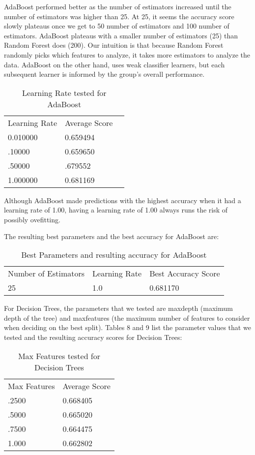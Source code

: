 \documentclass[11pt]{article}
\begin{document}
AdaBoost performed better as the number of estimators increased until the number of estimators was higher than 25. At 25, it seems the accuracy score slowly plateaus once we get to 50 number of estimators and 100 number of estimators. AdaBoost plateaus with a smaller number of estimators (25) than Random Forest does (200). Our intuition is that because Random Forest randomly picks which features to analyze, it takes more estimators to analyze the data. AdaBoost on the other hand, uses weak classifier learners, but each subsequent learner is informed by the group's overall performance. 

\begin{table}[H]
\centering
\caption{Learning Rate tested for AdaBoost}
\label{my-label}
\begin{tabular}{lll}
Learning Rate & Average Score &  \\
0.010000      & 0.659494      &  \\
.10000        & 0.659650      &  \\
.50000        & .679552       &  \\
1.000000      & 0.681169      & 
\end{tabular}
\end{table}


Although AdaBoost made predictions with the highest accuracy when it had a learning rate of 1.00, having a learning rate of 1.00 always runs the risk of possibly ovefitting.

The resulting best parameters and the best accuracy for AdaBoost are:

\begin{table}[H]
\centering
\caption{Best Parameters and resulting accuracy for AdaBoost}
\label{my-label}
\begin{tabular}{lll}
Number of Estimators & Learning Rate & Best Accuracy Score \\
25                   & 1.0           & 0.681170
\end{tabular}
\end{table}

For Decision Trees, the parameters that we tested are max\textunderscore depth (maximum depth of the tree) and max\textunderscore features (the maximum number of features to consider when deciding on the best split).
Tables 8 and 9 list the parameter values that we tested and the resulting accuracy scores for Decision Trees:

\begin{table}[H]
\centering
\caption{Max Features tested for Decision Trees}
\label{my-label}
\begin{tabular}{ll}
Max Features & Average Score \\
.2500        & 0.668405            \\
.5000        & 0.665020            \\
.7500        & 0.664475            \\
1.000        & 0.662802           
\end{tabular}
\end{table}
\end{document}

